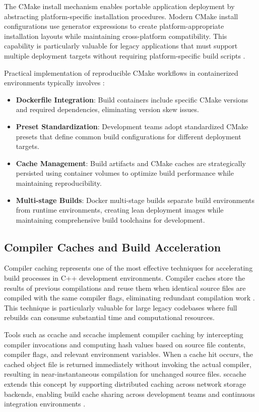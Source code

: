 The CMake install mechanism enables portable application deployment by abstracting platform-specific installation procedures.
Modern CMake install configurations use generator expressions to create platform-appropriate installation layouts while maintaining cross-platform compatibility.
This capability is particularly valuable for legacy applications that must support multiple deployment targets without requiring platform-specific build scripts \citep{swidzinskiModernCMakeEffortlessly2024}.

Practical implementation of reproducible CMake workflows in containerized environments typically involves \citep{danilovDockerizedBuildEnvironments2021}:
\begin{itemize}
    \item \textbf{Dockerfile Integration}: Build containers include specific CMake versions and required dependencies, eliminating version skew issues.
    \item \textbf{Preset Standardization}: Development teams adopt standardized CMake presets that define common build configurations for different deployment targets.
    \item \textbf{Cache Management}: Build artifacts and CMake caches are strategically persisted using container volumes to optimize build performance while maintaining reproducibility.
    \item \textbf{Multi-stage Builds}: Docker multi-stage builds separate build environments from runtime environments, creating lean deployment images while maintaining comprehensive build toolchains for development.
\end{itemize}

\subsection{Compiler Caches and Build Acceleration}
\label{subsec:compiler_caches}

Compiler caching represents one of the most effective techniques for accelerating build processes in C++ development environments.
Compiler caches store the results of previous compilations and reuse them when identical source files are compiled with the same compiler flags, eliminating redundant compilation work \citep{aidassoBuildOptimizationSystematic2025}.
This technique is particularly valuable for large legacy codebases where full rebuilds can consume substantial time and computational resources.

Tools such as ccache and sccache implement compiler caching by intercepting compiler invocations and computing hash values based on source file contents, compiler flags, and relevant environment variables.
When a cache hit occurs, the cached object file is returned immediately without invoking the actual compiler, resulting in near-instantaneous compilation for unchanged source files.
sccache extends this concept by supporting distributed caching across network storage backends, enabling build cache sharing across development teams and continuous integration environments \citep{mozillaSccacheSharedCompilation2025}.

